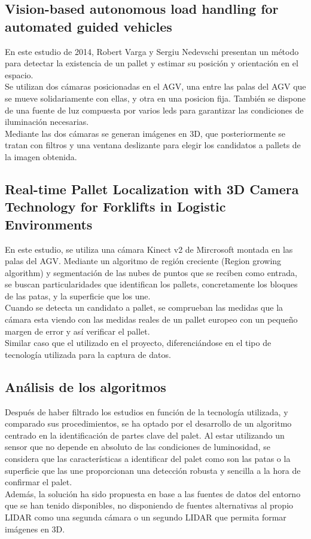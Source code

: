 \subsection{Vision-based autonomous load handling for automated guided vehicles}
En este estudio de 2014, Robert Varga y Sergiu Nedevschi presentan un método para detectar la existencia de un pallet y estimar su posición y orientación en el espacio.\\
Se utilizan dos cámaras posicionadas en el AGV, una entre las palas del AGV que se mueve solidariamente con ellas, y otra en una posicion fija.
También se dispone de una fuente de luz compuesta por varios leds para garantizar las condiciones de iluminación necesarias.\\
Mediante las dos cámaras se generan imágenes en 3D, que posteriormente se tratan con filtros y una ventana deslizante para elegir los candidatos a pallets de la imagen obtenida.


\subsection{Real-time Pallet Localization with 3D Camera Technology for Forklifts in Logistic Environments}
En este estudio, se utiliza una cámara Kinect v2 de Mircrosoft montada en las palas del AGV. Mediante un algoritmo de región creciente (Region growing algorithm) y segmentación de las nubes de puntos que se reciben como entrada, se buscan particularidades que identifican los pallets, concretamente los bloques de las patas, y la superficie que los une. \\ Cuando se detecta un candidato a pallet, se comprueban las medidas que la cámara esta viendo con las medidas reales de un pallet europeo con un pequeño margen de error y así verificar el pallet. \\ Similar caso que el utilizado en el proyecto, diferenciándose en el tipo de tecnología utilizada para la captura de datos.

\subsection{Análisis de los algoritmos}
Después de haber filtrado los estudios en función de la tecnología utilizada, y comparado sus procedimientos, se ha optado por el desarrollo de un algoritmo centrado en la identificación de partes clave del palet. Al estar utilizando un sensor que no depende en absoluto de las condiciones de luminosidad, se considera que las características a identificar del palet como son las patas o la superficie que las une proporcionan una detección robusta y sencilla a la hora de confirmar el palet. \\ Además, la solución ha sido propuesta en base a las fuentes de datos del entorno que se han tenido disponibles, no disponiendo de fuentes alternativas al propio LIDAR como una segunda cámara o un segundo LIDAR que permita formar imágenes en 3D.